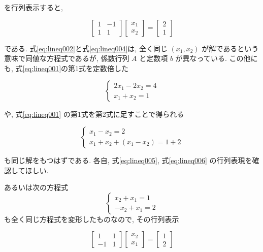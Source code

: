 \documentclass[a4paper]{scrbook}
\theoremstyle{definition}
\begin{document}
を行列表示すると,

\begin{equation}
\begin{bmatrix}1 & -1\\
1 & 1
\end{bmatrix}\begin{bmatrix}x_{1}\\
x_{2}
\end{bmatrix}=\begin{bmatrix}2\\
1
\end{bmatrix} \label{eq:lineq004}
\end{equation}

である. 式\eqref{eq:lineq002}と式\eqref{eq:lineq004}は, 全く同じ
\((x_{1},x_{2})\) が解であるという意味で同値な方程式であるが, 係数行列
\(A\) と定数項 \(b\) が異なっている. この他にも,
式\eqref{eq:lineq001}の第1式を定数倍した

\begin{equation}
\begin{cases}
2x_{1}-2x_{2}=4\\
x_{1}+x_{2}=1
\end{cases} \label{eq:lineq005}
\end{equation}

や, 式\eqref{eq:lineq001} の第1式を第2式に足すことで得られる

\begin{equation}
\begin{cases}
x_{1}-x_{2}=2\\
x_{1}+x_{2}+(x_{1}-x_{2})=1+2
\end{cases} \label{eq:lineq006}
\end{equation}

も同じ解をもつはずである. 各自, 式\eqref{eq:lineq005}, 式\eqref{eq:lineq006}
の行列表現を確認してほしい.

あるいは次の方程式 \[
\begin{cases}
x_{2}+x_{1}=1\\
-x_{2}+x_{1}=2
\end{cases}
\] も全く同じ方程式を変形したものなので, その行列表示

\begin{equation}
\begin{bmatrix}1 & 1\\
-1 & 1
\end{bmatrix}\begin{bmatrix}x_{2}\\
x_{1}
\end{bmatrix}=\begin{bmatrix}1\\
2
\end{bmatrix}\label{eq:lineq007}
\end{equation}
\end{document}
